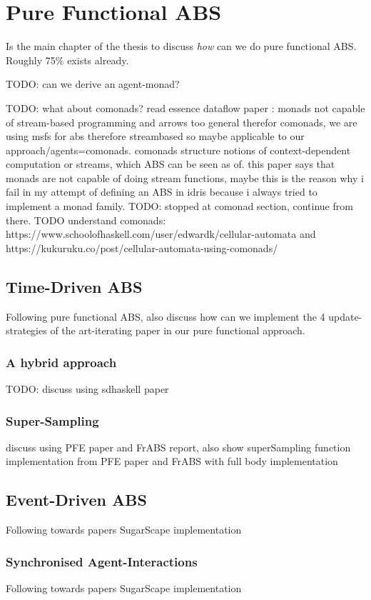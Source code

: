 \chapter{Pure Functional ABS}
\label{ch:pfABS}

Is the main chapter of the thesis to discuss \textit{how} can we do pure functional ABS. Roughly 75\% exists already.


TODO: can we derive an agent-monad?

TODO: what about comonads? read essence dataflow paper \cite{uustalu_essence_2006}: monads not capable of stream-based programming and arrows too general therefor comonads, we are using msfs for abs therefore streambased so maybe applicable to our approach/agents=comonads. comonads structure notions of context-dependent computation or streams, which ABS can be seen as of. this paper says that monads are not capable of doing stream functions, maybe this is the reason why i fail in my attempt of defining an ABS in idris because i always tried to implement a monad family. TODO: stopped at comonad section, continue from there. TODO understand comonads: https://www.schoolofhaskell.com/user/edwardk/cellular-automata and https://kukuruku.co/post/cellular-automata-using-comonads/

\section{Time-Driven ABS}
Following pure functional ABS, also discuss how can we implement the 4 update-strategies of the art-iterating paper in our pure functional approach.

\subsection{A hybrid approach}
TODO: discuss using sdhaskell paper

\subsection{Super-Sampling}
discuss using PFE paper and FrABS report, also show superSampling function implementation from PFE paper and FrABS with full body implementation

\section{Event-Driven ABS}
Following towards papers SugarScape implementation
\subsection{Synchronised Agent-Interactions}
Following towards papers SugarScape implementation

